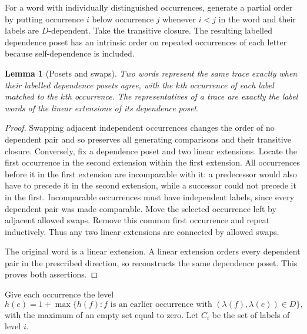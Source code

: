 \documentclass[11pt,a4paper]{article}
\newtheorem{lemma}[lemma]{Lemma}
\theoremstyle{definition}
\theoremstyle{remark}
\begin{document}
For a word with individually distinguished occurrences, generate a partial order by putting occurrence $i$ below occurrence $j$ whenever $i<j$ in the word and their labels are $D$-dependent. Take the transitive closure. The resulting labelled dependence poset has an intrinsic order on repeated occurrences of each letter because self-dependence is included.

\begin{lemma}[Posets and swaps]\label{cdc:ct:lem:poset-swaps}
Two words represent the same trace exactly when their labelled dependence posets agree, with the $k$th occurrence of each label matched to the $k$th occurrence. The representatives of a trace are exactly the label words of the linear extensions of its dependence poset.
\end{lemma}
\begin{proof}
Swapping adjacent independent occurrences changes the order of no dependent pair and so preserves all generating comparisons and their transitive closure. Conversely, fix a dependence poset and two linear extensions. Locate the first occurrence in the second extension within the first extension. All occurrences before it in the first extension are incomparable with it: a predecessor would also have to precede it in the second extension, while a successor could not precede it in the first. Incomparable occurrences must have independent labels, since every dependent pair was made comparable. Move the selected occurrence left by adjacent allowed swaps. Remove this common first occurrence and repeat inductively. Thus any two linear extensions are connected by allowed swaps.

The original word is a linear extension. A linear extension orders every dependent pair in the prescribed direction, so reconstructs the same dependence poset. This proves both assertions.
\end{proof}

Give each occurrence the level
\begin{equation}\label{cdc:ct:eq:level}
 h(e)=1+\max\{h(f): f\text{ is an earlier occurrence with }(\lambda(f),\lambda(e))\in D\},
\end{equation}
with the maximum of an empty set equal to zero. Let $C_i$ be the set of labels of level $i$.
\end{document}

